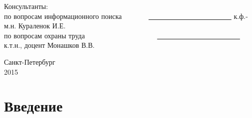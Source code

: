 \documentclass[12pt,a4paper]{report}
\renewcommand{\contentsname}{Содержание}
\begin{document}
\begin{titlepage}
\begin{center}
\vspace*{0.3cm}

\begin{flushleft}
Консультанты:\\
\vspace*{0.3cm}
по вопросам информационного поиска \ \ \ \ \ \ \ \underline{ \ \ \ \ \ \ \ \ \ \ \ \ \ \ \ \ \ \ \ \ \ \ \ } к.ф.-м.н. Кураленок И.Е.\\
\vspace*{0.3cm}
по вопросам охраны труда \ \ \ \ \ \ \ \ \ \ \ \ \ \ \ \ \ \ \ \ \underline{ \ \ \ \ \ \ \ \ \ \ \ \ \ \ \ \ \ \ \ \ \ \ \ } к.т.н., доцент Монашков В.В.
\end{flushleft}

\end{center}
\vfill
\begin{center}
{\large Санкт-Петербург \\ 2015}
\end {center}
\end{titlepage}


\topmargin -1cm
\hoffset -0.7in
\textwidth 6.0in
\textheight 9.0in
\parindent 1cm

\makeatletter
{}
\apptocmd{\@makechapterhead}{}{}{}
\makeatother

\setcounter{tocdepth}{4}
\normalsize

\renewcommand{\contentsname}{Содержание}
\tableofcontents

\chapter*{Введение}


\end{document}
